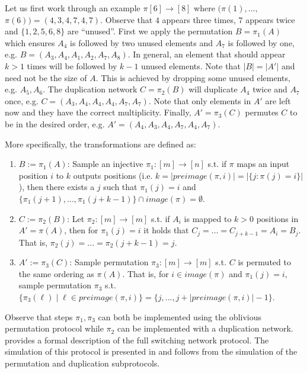  Let us first work through an example $\pi[6]\rightarrow[8]$ where $(\pi(1),...,$ $\pi(6))=(4,3,4,7,4,7)$. Observe that $4$ appears three times, $7$ appears twice and $\{1,2,5,6,8\}$ are ``unused''. First we apply the permutation $B=\pi_1(A)$ which ensures $A_4$ is followed by two unused elements and $A_7$ is followed by one, e.g. $B=(A_3,A_4,A_1,A_2,A_7,A_8)$. In general, an element that should appear $k>1$ times will be followed by $k-1$ unused elements. Note that $|B|=|A'|$ and need not be the size of $A$. This is achieved by dropping some unused elements, e.g. $A_5,A_6$. The duplication network $C=\pi_2(B)$ will duplicate $A_4$ twice and $A_7$ once, e.g. $C=(A_3,A_4,A_4,A_4,A_7,A_7)$. Note that only elements in $A'$ are left now and they have the correct multiplicity. Finally, $A'=\pi_3(C)$ permutes $C$ to be in the desired order, e.g. $A'=(A_4,A_3,A_4,A_7,A_4,A_7)$.
 
More specifically, the transformations are defined as:
\begin{enumerate}
	\item $B:=\pi_1(A)$: Sample an injective $\pi_1:[m]\rightarrow[n]$ s.t. if $\pi$ maps an input position $i$ to $k$ outputs positions (i.e. $k=|preimage(\pi,i)|=|\{ j : \pi(j)=i \}|$), then there exists a $j$ such that $\pi_1(j)=i$  and $\{\pi_1(j+ 1),...,\pi_1(j +k-1)\} \cap image(\pi) = \emptyset$. 
	
	\item $C:=\pi_2(B)$: Let $\pi_2:[m]\rightarrow[m]$ s.t. if $A_i$ is mapped to $k>0$ positions in $A'=\pi(A)$, then for $\pi_1(j)=i$ it holds that $ C_{j}=...=C_{j+k-1} = A_i=B_j$. That is, $\pi_2(j)=...=\pi_2(j+k-1)=j$.
	
	\item $A':=\pi_3(C)$: Sample permutation $\pi_3:[m]\rightarrow[m]$  s.t. $C$ is permuted to the same ordering as $\pi(A)$. That is, for $i\in image(\pi)$ and $\pi_1(j)=i$, sample permutation $\pi_3$ s.t. $\{\pi_3(\ell)\mid \ell\in preimage(\pi,i)\} =\{j,...,j+| preimage(\pi,i)|-1\}$.
	
\end{enumerate}

Observe that steps $\pi_1,\pi_3$ can both be implemented using the oblivious permutation protocol while $\pi_2$ can be implemented with a duplication network.  provides a formal description of the full switching network protocol. The simulation of this protocol is presented in  and follows from the simulation of the permutation and duplication subprotocols. 

